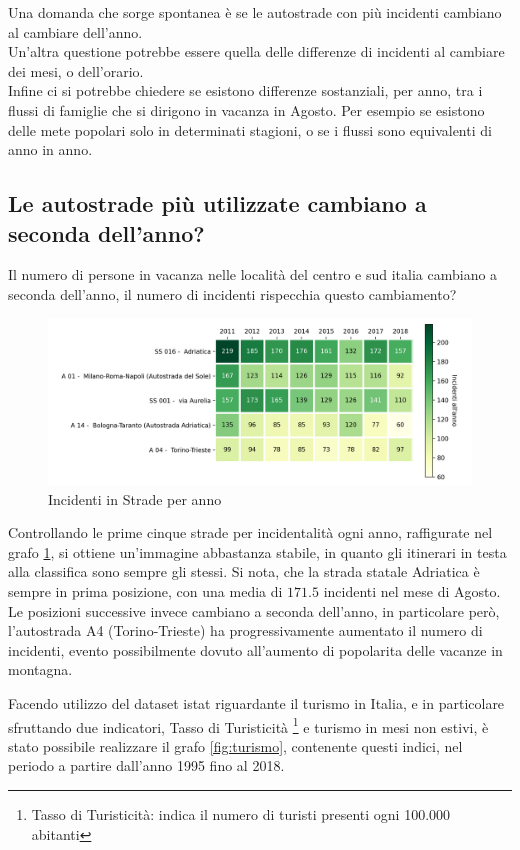 \documentclass[a4paper]{report}
\begin{document}
Una domanda che sorge spontanea è se le autostrade con più incidenti cambiano 
al cambiare dell'anno.\\
Un'altra questione potrebbe essere quella delle differenze di incidenti al cambiare dei mesi, 
o dell'orario.\\
Infine ci si potrebbe chiedere se esistono differenze sostanziali, per anno, tra i flussi di 
famiglie che si dirigono in vacanza in Agosto. Per esempio se esistono delle mete 
popolari solo in determinati stagioni, o se i flussi sono equivalenti di anno in anno.


\subsection{Le autostrade più utilizzate cambiano a seconda dell'anno?}

Il numero di persone in vacanza nelle località del centro e sud italia cambiano 
a seconda dell'anno, il numero di incidenti rispecchia questo cambiamento?

\begin{figure}
    \includegraphics[width=\linewidth]{../src/incidenti/incidenti_aci/agosto/vacanze_autostrade.png}
    \caption{Incidenti in Strade per anno}
    \label{fig:autostrade-anno}
\end{figure}

Controllando le prime cinque strade per incidentalità ogni anno, 
raffigurate nel grafo \ref{fig:autostrade-anno}, si ottiene un'immagine 
abbastanza stabile, in quanto gli itinerari in testa alla classifica sono sempre gli stessi.
Si nota, che la strada statale Adriatica è sempre in prima posizione, 
con una media di $171.5$ incidenti nel mese di Agosto.
Le posizioni successive invece cambiano a seconda dell'anno, in particolare però, 
l'autostrada A4 (Torino-Trieste) ha progressivamente aumentato il numero di 
incidenti, evento possibilmente dovuto all'aumento di popolarita delle vacanze 
in montagna.

Facendo utilizzo del dataset istat riguardante il turismo in Italia, e in particolare sfruttando 
due indicatori, Tasso di Turisticità
\footnote{Tasso di Turisticità: indica il numero di turisti presenti ogni 100.000 
abitanti\cite{ONTIT:1}} 
e turismo in mesi non estivi,
è stato possibile realizzare il grafo \ref{fig:turismo}, contenente questi indici, 
nel periodo a partire dall'anno 1995 fino al 2018.
\end{document}
